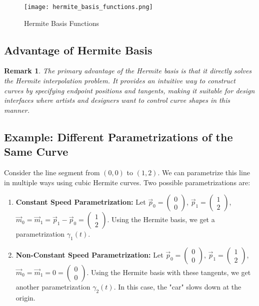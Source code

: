 \documentclass{article}
\newtheorem{remark}{Remark}
\begin{document}
\begin{figure}[h]
\centering
\texttt{[image: hermite\_basis\_functions.png]}
\caption{Hermite Basis Functions}
\label{fig:hermite_basis_functions}
\end{figure}


\subsection{Advantage of Hermite Basis}

\begin{remark}
The primary advantage of the Hermite basis is that it directly solves the Hermite interpolation problem.  It provides an intuitive way to construct curves by specifying endpoint positions and tangents, making it suitable for design interfaces where artists and designers want to control curve shapes in this manner.
\end{remark}

\subsection{Example: Different Parametrizations of the Same Curve}

Consider the line segment from \((0, 0)\) to \((1, 2)\).  We can parametrize this line in multiple ways using cubic Hermite curves. Two possible parametrizations are:

\begin{enumerate}
    \item \textbf{Constant Speed Parametrization:}
    Let \(\vec{p}_0 = \begin{pmatrix} 0 \\ 0 \end{pmatrix}\), \(\vec{p}_1 = \begin{pmatrix} 1 \\ 2 \end{pmatrix}\), \(\vec{m}_0 = \vec{m}_1 = \vec{p}_1 - \vec{p}_0 = \begin{pmatrix} 1 \\ 2 \end{pmatrix}\).
    Using the Hermite basis, we get a parametrization \(\gamma_1(t)\).

    \item \textbf{Non-Constant Speed Parametrization:}
    Let \(\vec{p}_0 = \begin{pmatrix} 0 \\ 0 \end{pmatrix}\), \(\vec{p}_1 = \begin{pmatrix} 1 \\ 2 \end{pmatrix}\), \(\vec{m}_0 = \vec{m}_1 = 0 = \begin{pmatrix} 0 \\ 0 \end{pmatrix}\).
    Using the Hermite basis with these tangents, we get another parametrization \(\gamma_2(t)\). In this case, the "car" slows down at the origin.
\end{enumerate}
\end{document}
